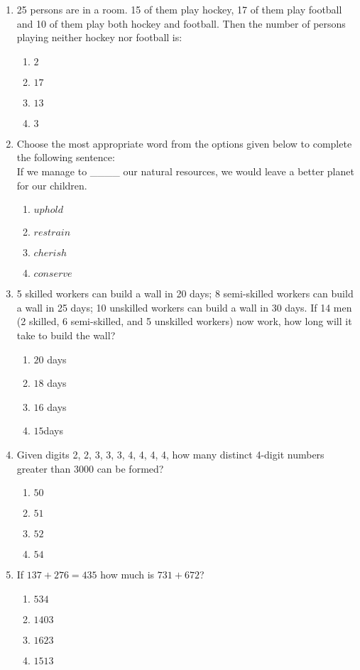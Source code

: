 \documentclass[journal,12pt,onecolumn]{IEEEtran}
\theoremstyle{remark}
\begin{document}
\begin{enumerate}
\item 25 persons are in a room. 15 of them play hockey, 17 of them play football and 10 of them play both hockey and football. Then the number of persons playing neither hockey nor football is:
    \begin{enumerate}
        \item $  2 $
        \item $  17 $
        \item $  13 $
        \item $  3 $
    \end{enumerate}

    \item Choose the most appropriate word from the options given below to complete the following sentence: \\
    {If we manage to \_\_\_\_ our natural resources, we would leave a better planet for our children.}
    \begin{enumerate}
        \item $  {uphold} $
        \item $  {restrain} $
        \item $  {cherish} $
        \item $  {conserve} $
    \end{enumerate}

    \item 5 skilled workers can build a wall in 20 days; 8 semi-skilled workers can build a wall in 25 days; 10 unskilled workers can build a wall in 30 days. If 14 men (2 skilled, 6 semi-skilled, and 5 unskilled workers) now work, how long will it take to build the wall?
    \begin{enumerate}
        \item $  20 $ days 
        \item $  18 $ days 
        \item $  16$  days 
        \item $  15$days 
    \end{enumerate}

    \item Given digits 2, 2, 3, 3, 3, 4, 4, 4, 4, how many distinct 4-digit numbers greater than 3000 can be formed?
    \begin{enumerate}
        \item $  50 $
        \item $  51 $
        \item $ 52 $
        \item $ 54 $
    \end{enumerate}
\item If $137 + 276 = 435$ how much is $731 + 672$?
\begin{enumerate}
    \item $534$
    \item $1403$
    \item $1623$
    \item $1513$
\end{enumerate}


\end{enumerate}
\end{document}
